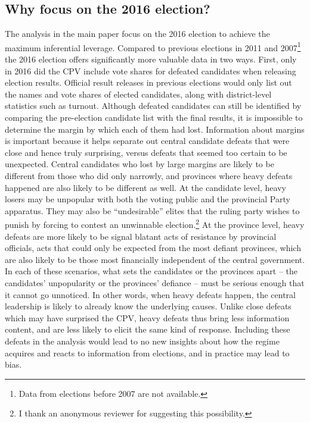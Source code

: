 \documentclass[12pt]{article}
\newcommand{\1}{\mathbbm{1}}
\begin{document}
\subsection{Why focus on the 2016 election?}

The analysis in the main paper focus on the 2016 election to achieve the maximum inferential leverage. Compared to previous elections in 2011 and 2007\footnote{Data from elections before 2007 are not available.} the 2016 election offers significantly more valuable data in two ways. First, only in 2016 did the CPV include vote shares for defeated candidates when releasing election results. Official result releases in previous elections would only list out the names and vote shares of elected candidates, along with district-level statistics such as turnout. Although defeated candidates can still be identified by comparing the pre-election candidate list with the final results, it is impossible to determine the margin by which each of them had lost. Information about margins is important because it helps separate out central candidate defeats that were close and hence truly surprising, versus defeats that seemed too certain to be unexpected. Central candidates who lost by large margins are likely to be different from those who did only narrowly, and provinces where heavy defeats happened are also likely to be different as well. At the candidate level, heavy losers may be unpopular with both the voting public and the provincial Party apparatus. They may also be ``undesirable'' elites that the ruling party wishes to punish by forcing to contest an unwinnable election.\footnote{I thank an anonymous reviewer for suggesting this possibility.} At the province level, heavy defeats are more likely to be signal blatant acts of resistance by provincial officials, acts that could only be expected from the most defiant provinces, which are also likely to be those most financially independent of the central government. In each of these scenarios, what sets the candidates or the provinces apart -- the candidates' unpopularity or the provinces' defiance -- must be serious enough that it cannot go unnoticed. In other words, when heavy defeats happen, the central leadership is likely to already know the underlying causes. Unlike close defeats which may have surprised the CPV, heavy defeats thus bring less information content, and are less likely to elicit the same kind of response. Including these defeats in the analysis would lead to no new insights about how the regime acquires and reacts to information from elections, and in practice may lead to bias.
\end{document}
